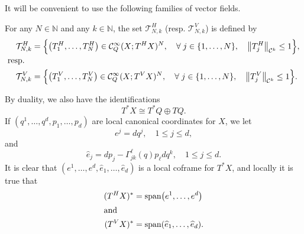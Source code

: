 \documentclass[AHL,Unicode,longabstracts]{cedram}
\newcommand{\N}{\mathbb{N}}
\newcommand{\clT}{\mathcal{T}}
\newcommand{\clC}{\mathcal{C}}
\DeclareMathOperator{\spann}{span}
\let\oldforall\forall
\renewcommand*{\forall}{\mathrel{\oldforall}}
\let\originalleft\left
\let\originalright\right
\renewcommand{\left}{\mathopen{}\mathclose\bgroup\originalleft}
\renewcommand{\right}{\aftergroup\egroup\originalright}
\begin{document}
It will be convenient to use the following families of vector fields.
\begin{defi}\label{de.famcalT}
For any $N\in \N$ and any $k\in \N$, the set $\clT_{N,k}^{H}$ (resp. $\clT_{N,k}^{V}$) is defined by
\begin{align*}
\clT_{N,k}^{H} &=\left\{\left(T_{1}^{H},\dots, T_{N}^{H}\right)\in \clC^{\infty}_{Q}(X;T^{H}X)^{N},\quad \forall j\in \left\{1,\dots, N\right\},\quad \left\|T_{j}^{H}\right\|_{\clC^{k}}\leq 1\right\},\\
\intertext{resp.}\quad\clT_{N,k}^{V}&=\left\{\left(T_{1}^{V},\dots, T_{N}^{V}\right)\in \clC^{\infty}_{Q}(X;T^{V}X)^{N},\quad \forall j\in \left\{1,\dots, N\right\},\quad \left\|T_{j}^{V}\right\|_{\clC^{k}}\leq 1\right\}.
\end{align*}
\end{defi}

By duality, we also have the identifications
\begin{equation}\label{identification_of_T*X}
T^* X \cong T^*Q \oplus T Q.
\end{equation}
If $(q^1, \dots, q^d, p_1, \dots, p_d)$ are local canonical coordinates for $X$, we let
\begin{equation}
e^j = dq^j, \quad 1 \le j \le d,
\end{equation}
and
\begin{equation}
\widehat{e}_j = dp_j - \Gamma^\ell_{jk}(q) p_\ell d q^k, \quad 1 \le j \le d.
\end{equation}
It is clear that $(e^1, \dots, e^d, \widehat{e}_1, \dots, \widehat{e}_d)$ is a local coframe for $T^* X$, and locally it is true that
\begin{align}
(T^H X)^* &= \spann \left(e^1, \dots, e^d\right)\\
\intertext{and}
(T^V X)^* &= \spann \left(\widehat{e}_1, \dots, \widehat{e}_d \right).
\end{align}
\end{document}
